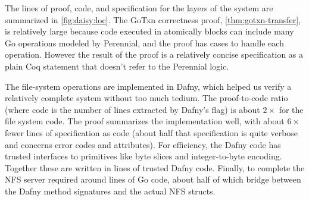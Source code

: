 The lines of proof, code, and specification for the layers of the system are
summarized in \cref{fig:daisy:loc}. The GoTxn correctness proof, \cref{thm:gotxn-transfer}, is
relatively large because code executed in atomically blocks can include many Go
operations modeled by Perennial, and the proof has cases to handle
each operation. However the result of the proof is a relatively concise
specification as a plain Coq statement that doesn't refer to the Perennial
logic.


The file-system operations are implemented in Dafny, which helped us verify a
relatively complete system without too much tedium. The
proof-to-code ratio (where code is the number of lines extracted by Dafny's
 flag) is about $2\times$ for the file system code.
The proof summarizes the implementation well, with about $6\times$ fewer lines
of specification as code (about half that specification is quite verbose and concerns
error codes and attributes). For efficiency, the Dafny code has trusted interfaces to
primitives like byte slices and integer-to-byte encoding. Together these are
written in \daisyTrustedSpec lines of trusted Dafny code.
Finally, to complete the NFS server required around  lines of Go
code, about half of which bridge between the Dafny method signatures and the
actual NFS structs.

\begin{comment}
begin
    rm -rf src-compiled
    for file in src/*/**.dfy
        set -l path (string sub --start 4 $file)
        set -l dir (dirname $path)
        mkdir -p src-compiled/$dir
        dafny /printMode:NoGhost /dafnyVerify:0 /rprint:src-compiled/$path $file &
    end
    wait
    cloc --read-lang-def ~/dafny-lang.txt src-compiled
    cloc --read-lang-def ~/dafny-lang.txt src
end
\end{comment}



\begin{comment}
begin
    gsed -n '/method[^(]* [A-Z]*(/,/^\s*{/p' src/fs/dir_fs.dfy
    cat src/fs/nfs.s.dfy
end | wc -l
\end{comment}
%

